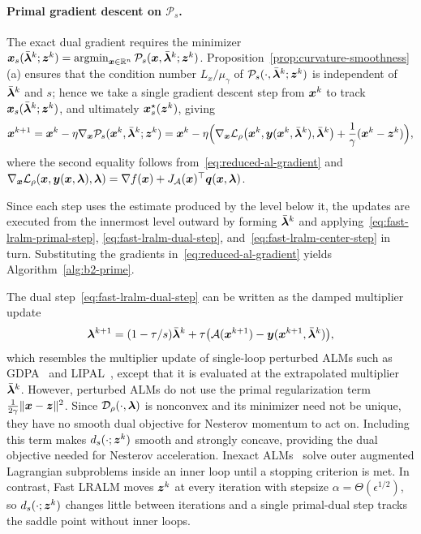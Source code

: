 \paragraph{Primal gradient descent on \(\mathcal P_s\).}
The exact dual gradient requires the minimizer
\(\bm{x}_s(\bar{\bm{\lambda}}^k;\bm{z}^k)=\operatorname*{\mathrm{argmin}}_{\bm{x}\in\mathbb{R}^n}\mathcal P_s(\bm{x},\bar{\bm{\lambda}}^k;\bm{z}^k)\).
Proposition~\ref{prop:curvature-smoothness}(a) ensures that the condition number
\(L_x/\mu_\gamma\) of \(\mathcal P_s(\cdot,\bar{\bm{\lambda}}^k;\bm{z}^k)\) is
independent of \(\bar{\bm{\lambda}}^k\) and \(s\); hence we take a
single gradient descent step from \(\bm{x}^k\) to track
\(\bm{x}_s(\bar{\bm{\lambda}}^k;\bm{z}^k)\), and ultimately \(\bm{x}_s^\star(\bm{z}^k)\), giving
\begin{equation}
    \bm{x}^{k+1}
    =\bm{x}^k-\eta\nabla_{\bm{x}}\mathcal P_s(\bm{x}^k,\bar{\bm{\lambda}}^k;\bm{z}^k)
    =\bm{x}^k-\eta\Bigl(\nabla_{\bm{x}}\mathcal{L}_\rho\bigl(\bm{x}^k,\bm{y}(\bm{x}^k,\bar{\bm{\lambda}}^k),
    \bar{\bm{\lambda}}^k\bigr)+\frac1\gamma(\bm{x}^k-\bm{z}^k)\Bigr),
    \label{eq:fast-lralm-primal-step}
\end{equation}
where the second equality follows from~\eqref{eq:reduced-al-gradient} and
\(\nabla_{\bm{x}}\mathcal{L}_\rho(\bm{x},\bm{y}(\bm{x},\bm{\lambda}),\bm{\lambda})
=\nabla f(\bm{x})+J_{\mathcal{A}}(\bm{x})^\top\bm{q}(\bm{x},\bm{\lambda})\). 

Since each step uses the estimate produced by the level below it, the updates
are executed from the innermost level outward by forming \(\bar{\bm{\lambda}}^k\) and
applying~\eqref{eq:fast-lralm-primal-step}, \eqref{eq:fast-lralm-dual-step},
and~\eqref{eq:fast-lralm-center-step} in turn. Substituting the gradients
in~\eqref{eq:reduced-al-gradient} yields Algorithm~\ref{alg:b2-prime}.

\begin{remark}
The dual step~\eqref{eq:fast-lralm-dual-step} can be written as the damped
multiplier update
\[
    \bm{\lambda}^{k+1}=(1-\tau/s)\bar{\bm{\lambda}}^k
    +\tau\bigl(\mathcal{A}(\bm{x}^{k+1})-\bm{y}(\bm{x}^{k+1},\bar{\bm{\lambda}}^k)\bigr),
\]
which resembles the multiplier update of single-loop perturbed ALMs such as
GDPA~\cite{luSingleLoopGradientDescent2022} and
LIPAL~\cite{elbourkhissi2025perturbed}, except that it is evaluated at the
extrapolated multiplier \(\bar{\bm{\lambda}}^k\). However, perturbed ALMs do not use the
primal regularization term \(\frac{1}{2\gamma}\|\bm{x}-\bm{z}\|^2\). Since
\(\mathcal{D}_\rho(\cdot,\bm{\lambda})\) is nonconvex and its minimizer need not be unique,
they have no smooth dual objective for Nesterov momentum to act on. Including
this term makes \(d_s(\cdot;\bm{z}^k)\) smooth and strongly concave, providing the
dual objective needed for Nesterov acceleration. Inexact
ALMs~\cite{sahin2019inexact,li2021rate} solve outer augmented Lagrangian
subproblems inside an inner loop until a stopping criterion is met. In contrast,
Fast LRALM moves \(\bm{z}^k\) at every iteration with stepsize
\(\alpha=\Theta(\epsilon^{1/2})\), so \(d_s(\cdot;\bm{z}^k)\) changes little
between iterations and a single primal-dual step tracks the saddle point without
inner loops.
\end{remark}

